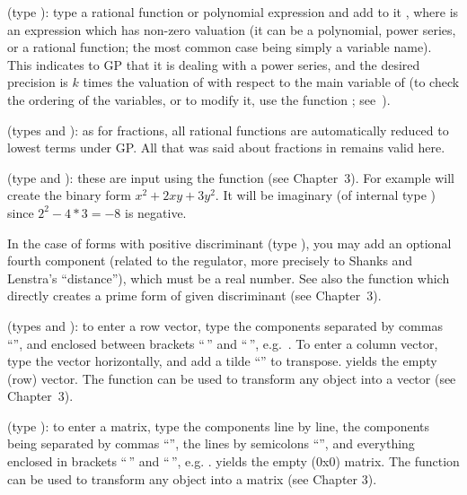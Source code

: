 \label{se:series}
(type ): type a rational function or
polynomial expression and add to it \hbox{},
where  is an expression which has non-zero valuation (it can be a
polynomial, power series, or a rational function; the most common case being
simply a variable name).
This indicates to GP that it is dealing with a power series, and the desired
precision is $k$ times the valuation of  with respect to the
main variable of  (to check the ordering of the variables, or
to modify it, use the function ; see~).

(types  and ): as for fractions, all rational
functions are automatically reduced to lowest terms under GP. All that was
said about fractions in  remains valid here.

%
(type  and ):
these are input using the function  (see Chapter~3). For example
 will create the binary form $x^2+2xy+3y^2$. It will be
imaginary (of internal type ) since $2^2 - 4*3 = -8$ is negative.

In the case of forms with positive discriminant (type ), you
may add an optional fourth component (related to the regulator, more
precisely to Shanks and Lenstra's ``distance''), which must be a real number.
See also the function  which directly creates a prime form
of given discriminant (see Chapter~3).

 (types
 and ): to enter a row vector, type the components
separated by commas ``\kbd{,}'', and enclosed between brackets
``\kbd{[}$\,$'' and ``$\,$\kbd{]}'', e.g.~\kbd{[1,2,3]}. To enter a column
vector, type the vector horizontally, and add a tilde ``\til'' to
transpose. \kbd{[ ]} yields the empty (row) vector. The function 
can be used to transform any object into a vector (see Chapter~3).

 (type ): to enter a matrix, type
the components line by line, the components being separated by commas
``\kbd{,}'', the lines by semicolons ``\kbd{;}'', and everything enclosed
in brackets ``\kbd{[}$\,$'' and ``$\,$\kbd{]}'', e.g. \kbd{[x,y; z,t;
u,v]}. \kbd{[ ; ]} yields the empty (0x0) matrix. The function 
can be used to transform any object into a matrix (see Chapter 3).

